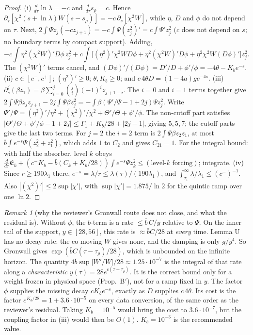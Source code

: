 \documentclass[11pt]{article}
\theoremstyle{remark}\newtheorem{remark}[theorem]{Remark}
\newcommand{\E}{\mathfrak E}\newcommand{\B}{\mathfrak B}
\begin{document}
\begin{proof}
(i) $\frac{d}{d\tau}\ln\lambda=-c$ and $\frac{d}{d\tau}s_\rho=c$. Hence $\partial_\tau[\chi^2(s+\ln\lambda)W(s-s_\rho)]=-c\,\partial_s[\chi^2W]$, while $\eta$, $D$ and $\phi$ do not depend on $\tau$. Next, $2\int\Psi z_j(-cz_{j+1})=-c\int\Psi(z_j^2)'=c\int\Psi'z_j^2$ ($c$ does not depend on $s$; no boundary terms by compact support). Adding,
\[
-c\!\int\eta^2(\chi^2W)'D\phi\,z_j^2+c\!\int\bigl[(\eta^2)'\chi^2WD\phi+\eta^2(\chi^2W)'D\phi+\eta^2\chi^2W(D\phi)'\bigr]z_j^2 .
\]
The $(\chi^2W)'$ terms cancel, and $(D\phi)'/(D\phi)=D'/D+\phi'/\phi=-4\theta-K_be^{-s}$.
(ii) $c\in[c^-,c^+]$; $(\eta^2)'\ge0$; $\theta,K_b\ge0$; and $c\,4\theta D=(1-4a)ge^{-4s}$.
(iii) $\partial_s^j(\beta z_1)=\beta\sum_{i=0}^j\binom ji(-1)^iz_{j+1-i}$. The $i=0$ and $i=1$ terms together give $2\int\Psi\beta z_jz_{j+1}-2j\int\Psi\beta z_j^2=-\int\beta(\Psi'/\Psi-1+2j)\Psi z_j^2$. Write $\Psi'/\Psi=(\eta^2)'/\eta^2+(\chi^2)'/\chi^2+\Theta'/\Theta+\phi'/\phi$. The non-cutoff part satisfies $|\Theta'/\Theta+\phi'/\phi-1+2j|\le\Gamma_1+K_b/28+|2j-1|$, giving $5,5,7$; the cutoff parts give the last two terms. For $j=2$ the $i=2$ term is $2\int\Psi\beta z_2z_1$, at most $\bar b\int e^{-s}\Psi(z_2^2+z_1^2)$, which adds $1$ to $C_2$ and gives $C_{21}=1$. For the integral bound: with half the absorber, level $k$ obeys $\frac d{d\tau}\E_k+(c^-K_b-\bar b(C_k+K_b/28))\int e^{-s}\Psi z_k^2\le(\text{level-}k\text{ forcing})$; integrate.
(iv) Since $r\ge190\lambda_1$ there, $e^{-s}=\lambda/r\le\lambda(\tau)/(190\lambda_1)$, and $\int_{\tau_1}^\infty\lambda/\lambda_1\le(c^-)^{-1}$. Also $|(\chi^2)'|\le2\sup|\chi'|$, with $\sup|\chi'|=1.875/\ln2$ for the quintic ramp over one $\ln2$.
\end{proof}
\begin{remark}[why the reviewer's Gronwall route does not close, and what the residual is]
Without $\phi$, the $b$-term is a rate $\le\bar b\,C/y$ relative to $\Psi$. On the inner tail of the support, $y\in[28,56]$, this rate is $\approx\bar bC/28$ at \emph{every} time. Lemma U has no decay rate: the co-moving $W$ gives none, and the damping is only $g/y^4$. So Gronwall gives $\exp(\bar bC(\tau-\tau_\rho)/28)$, which is unbounded on the infinite horizon. The quantity $4\bar b\sup|W'/W|/28\approx1.25\cdot10^{-7}$ is the integral of that rate along a \emph{characteristic} $y(\tau)=28e^{c(\tau-\tau_\rho)}$. It is the correct bound only for a weight frozen in physical space (Prop.~B$'$), not for a ramp fixed in $y$. The factor $\phi$ supplies the missing decay $cK_be^{-s}$, exactly as $D$ supplies $c\,4\theta$. Its cost is the factor $e^{K_b/28}=1+3.6\cdot10^{-5}$ on every data conversion, of the same order as the reviewer's residual. Taking $K_b=10^{-5}$ would bring the cost to $3.6\cdot10^{-7}$, but the coupling factor in (iii) would then be $O(1)$. $K_b=10^{-3}$ is the recommended value.
\end{remark}
\end{document}
